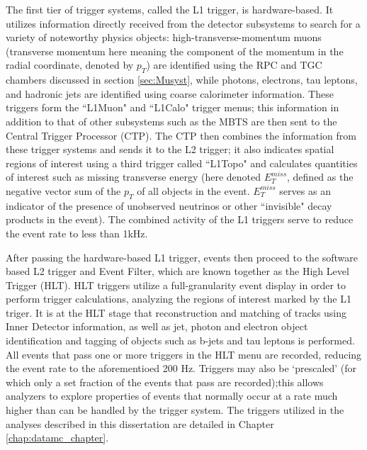 The first tier of trigger systems, called the L1 trigger, is hardware-based. It utilizes information directly received from the detector subsystems to search for a variety of noteworthy physics objects: high-transverse-momentum muons (transverse momentum here meaning the component of the momentum in the radial coordinate, denoted by $p_T$) are identified using the RPC and TGC chambers discussed in section \ref{sec:Musyst}, while photons, electrons, tau leptons, and hadronic jets are identified using coarse calorimeter information. These triggers form the ``L1Muon" and ``L1Calo" trigger menus; this information in addition to that of other subsystems such as the MBTS are then sent to the Central Trigger Processor (CTP). The CTP then combines the information from these trigger systems and sends it to the L2 trigger; it also indicates spatial regions of interest using a third trigger called ``L1Topo" and calculates quantities of interest such as missing transverse energy (here denoted $E_T^{miss}$, defined as the negative vector sum of the $p_T$ of all objects in the event. $E_T^{miss}$ serves as an indicator of the presence of unobserved neutrinos or other ``invisible" decay products in the event). The combined activity of the L1 triggers serve to reduce the event rate to less than 1kHz.

After passing the hardware-based L1 trigger, events then proceed to the software based L2 trigger and Event Filter, which are known together as the High Level Trigger (HLT). HLT triggers utilize a full-granularity event display in order to perform trigger calculations, analyzing the regions of interest marked by the L1 triger. It is at the HLT stage that reconstruction and matching of tracks using Inner Detector information, as well as jet, photon and electron object identification and tagging of objects such as b-jets and tau leptons is performed. All events that pass one or more triggers in the HLT menu are recorded, reducing the event rate to the aforementioed 200 Hz. Triggers may also be `prescaled' (for which only a set fraction of the events that pass are recorded);this allows analyzers to explore properties of events that normally occur at a rate much higher than can be handled by the trigger system. The triggers utilized in the analyses described in this dissertation are detailed in Chapter \ref{chap:datamc_chapter}.

